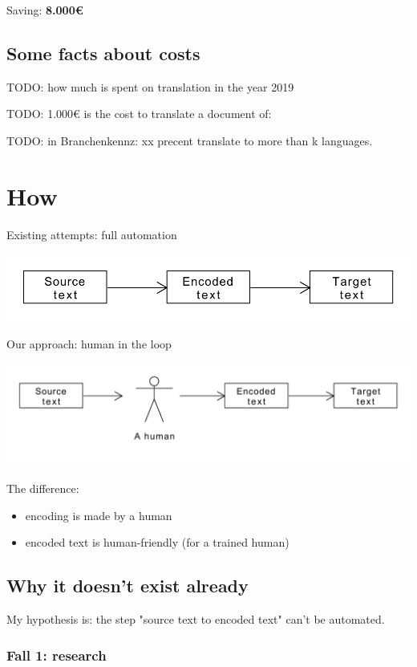 \documentclass{article}
\begin{document}
Saving: \textbf{8.000€}

\subsection{Some facts about costs}
TODO: how much is spent on translation in the year 2019

TODO: 1.000€ is the cost to translate a document of: 

TODO: in Branchenkennz: xx precent translate to more than k languages.

\section{How}

Existing attempts: full automation

\includegraphics[scale=0.5]{dia/how-current-world.pdf}

Our approach: human in the loop

\includegraphics[scale=0.5]{dia/how-tokimani.pdf}

The difference:
\begin{itemize}
\item encoding is made by a human
\item encoded text is human-friendly (for a trained human)
\end{itemize}

\subsection{Why it doesn't exist already}

My hypothesis is: the step "source text to encoded text" can't be automated.

\subsubsection{Fall 1: research}
\end{document}
